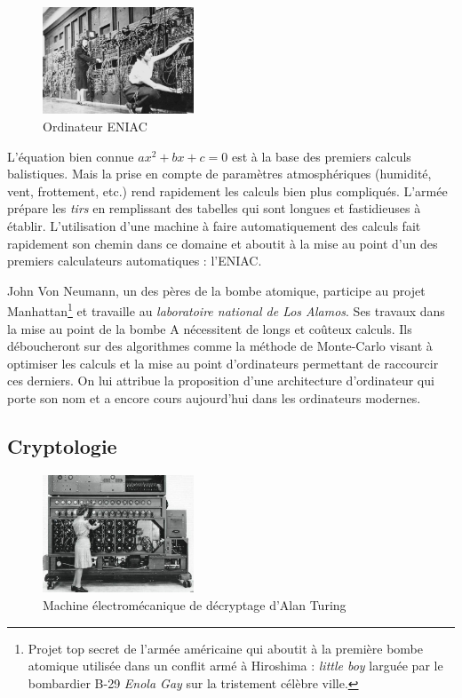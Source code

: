 \documentclass[a4paper,11pt]{book}
\begin{document}
\begin{figure} 
    \centering
    \includegraphics[width=0.4\textwidth]{media/machines/eniac-femmes.jpeg}
    \caption{Ordinateur ENIAC}
\end{figure}

L'équation bien connue $ax^2 + bx + c = 0$ est à la base des premiers calculs balistiques. Mais la prise en compte de paramètres atmosphériques (humidité, vent, frottement, etc.) rend rapidement les calculs bien plus compliqués. L'armée prépare les \textit{tirs} en remplissant des tabelles qui sont longues et fastidieuses à établir. L'utilisation d'une machine à faire automatiquement des calculs fait rapidement son chemin dans ce domaine et aboutit à la mise au point d'un des premiers calculateurs automatiques : l'ENIAC. 

John Von Neumann, un des pères de la bombe atomique, participe au projet Manhattan\footnote{Projet top secret de l'armée américaine qui aboutit à la première bombe atomique utilisée dans un conflit armé à Hiroshima : \textit{little boy} larguée par le bombardier B-29 \textit{Enola Gay} sur la tristement célèbre ville.} et travaille au \textit{laboratoire national de Los Alamos}. Ses travaux dans la mise au point de la bombe A nécessitent de longs et coûteux calculs. Ils déboucheront sur des algorithmes comme la méthode de Monte-Carlo visant à optimiser les calculs et la mise au point d'ordinateurs permettant de raccourcir ces derniers. On lui attribue la proposition d'une architecture d'ordinateur qui porte son nom et a encore cours aujourd'hui dans les ordinateurs modernes.

\subsection{Cryptologie}

\begin{figure} 
    \centering
    \includegraphics[width=0.4\textwidth]{media/machines/bombe.jpeg}
    \caption{Machine électromécanique de décryptage d'Alan Turing}
\end{figure}
\end{document}
